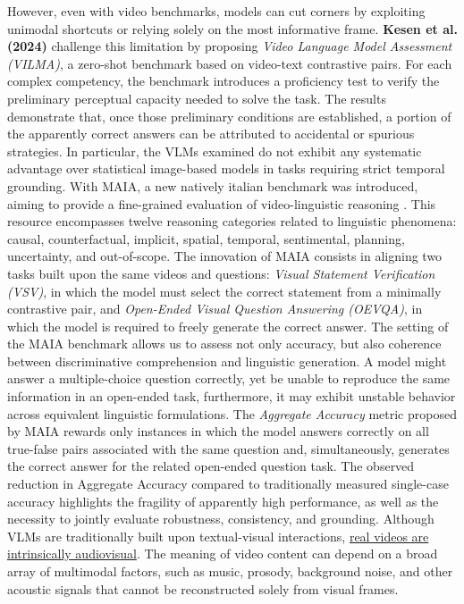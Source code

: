 However, even with video benchmarks, models can cut corners by exploiting unimodal shortcuts or relying solely on the most informative frame. \textbf{Kesen et al. (2024)}\cite{kesen2024vilma} challenge this limitation by proposing \textit{Video Language Model Assessment (VILMA)}, a zero-shot benchmark based on video-text contrastive pairs.
For each complex competency, the benchmark introduces a proficiency test to verify the preliminary perceptual capacity needed to solve the task. The results demonstrate that, once those preliminary conditions are established, a portion of the apparently correct answers can be attributed to accidental or spurious strategies. In particular, the VLMs examined do not exhibit any systematic advantage over statistical image-based models in tasks requiring strict temporal grounding.
With MAIA, a new natively italian benchmark was introduced, aiming to provide a fine-grained evaluation of video-linguistic reasoning \cite{testa2025maia}. This resource encompasses twelve reasoning categories related to linguistic phenomena: causal, counterfactual, implicit, spatial, temporal, sentimental, planning, uncertainty, and out-of-scope. The innovation of MAIA consists in aligning two tasks built upon the same videos and questions: \textit{Visual Statement Verification (VSV)}, in which the model must select the correct statement from a minimally contrastive pair, and \textit{Open-Ended Visual Question Answering (OEVQA)}, in which the model is required to freely generate the correct answer.
The setting of the MAIA benchmark allows us to assess not only accuracy, but also coherence between discriminative comprehension and linguistic generation. A model might answer a multiple-choice question correctly, yet be unable to reproduce the same information in an open-ended task, furthermore, it may exhibit unstable behavior across equivalent linguistic formulations.
The \textit{Aggregate Accuracy} metric proposed by MAIA rewards only instances in which the model answers correctly on all true-false pairs associated with the same question and, simultaneously, generates the correct answer for the related open-ended question task.
The observed reduction in Aggregate Accuracy compared to traditionally measured single-case accuracy highlights the fragility of apparently high performance, as well as the necessity to jointly evaluate robustness, consistency, and grounding.
Although VLMs are traditionally built upon textual-visual interactions, \underline{real videos are intrinsically audiovisual}. The meaning of video content can depend on a broad array of multimodal factors, such as music, prosody, background noise, and other acoustic signals that cannot be reconstructed solely from visual frames.
